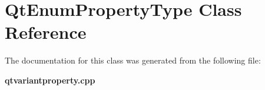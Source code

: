 \section{Qt\+Enum\+Property\+Type Class Reference}
\label{classQtEnumPropertyType}


The documentation for this class was generated from the following file\+:\begin{DoxyCompactItemize}
\item 
{\bf qtvariantproperty.\+cpp}\end{DoxyCompactItemize}
